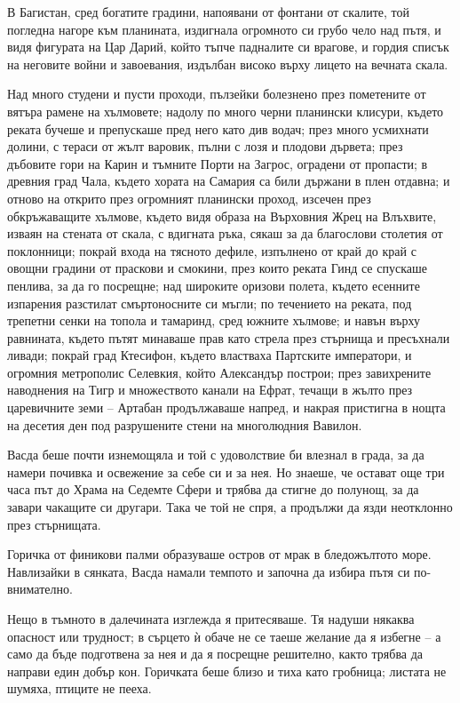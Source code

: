 \documentclass[oneside,10pt]{memoir}
\begin{document}
В Багистан, сред богатите градини, напоявани от фонтани от скалите, той погледна
нагоре към планината, издигнала огромното си грубо чело над пътя, и видя
фигурата на Цар Дарий, който тъпче падналите си врагове, и гордия списък на
неговите войни и завоевания, издълбан високо върху лицето на вечната скала.

Над много студени и пусти проходи, пълзейки болезнено през пометените от вятъра
рамене на хълмовете; надолу по много черни планински клисури, където реката
бучеше и препускаше пред него като див водач; през много усмихнати долини, с
тераси от жълт варовик, пълни с лозя и плодови дървета; през дъбовите гори на
Карин и тъмните Порти на Загрос, оградени от пропасти; в древния град Чала,
където хората на Самария са били държани в плен отдавна; и отново на открито
през огромният планински проход, изсечен през обкръжаващите хълмове, където видя
образа на Върховния Жрец на Влъхвите, изваян на стената от скала, с вдигната
ръка, сякаш за да благослови столетия от поклонници; покрай входа на тясното
дефиле, изпълнено от край до край с овощни градини от праскови и смокини, през
които реката Гинд се спускаше пенлива, за да го посрещне; над широките оризови
полета, където есенните изпарения разстилат смъртоносните си мъгли; по течението
на реката, под трепетни сенки на топола и тамаринд, сред южните хълмове; и навън
върху равнината, където пътят минаваше прав като стрела през стърнища и
пресъхнали ливади; покрай град Ктесифон, където властваха Партските императори,
и огромния метрополис Селевкия, който Александър построи; през завихрените
наводнения на Тигр и множеството канали на Ефрат, течащи в жълто през
царевичните земи -- Артабан продължаваше напред, и накрая пристигна в нощта на
десетия ден под разрушените стени на многолюдния Вавилон.

Васда беше почти изнемощяла и той с удоволствие би влезнал в града, за да намери
почивка и освежение за себе си и за нея. Но знаеше, че остават още три часа път
до Храма на Седемте Сфери и трябва да стигне до полунощ, за да завари чакащите
си другари. Така че той не спря, а продължи да язди неотклонно през
стърнищата.

Горичка от финикови палми образуваше остров от мрак в бледожълтото море.
Навлизайки в сянката, Васда намали темпото и започна да избира пътя си
по-внимателно.

Нещо в тъмното в далечината изглежда я притесяваше. Тя надуши някаква опасност
или трудност; в сърцето ѝ обаче не се таеше желание да я избегне -- а само да
бъде подготвена за нея и да я посрещне решително, както трябва да направи един
добър кон. Горичката беше близо и тиха като гробница; листата не шумяха, птиците
не пееха.
\end{document}
